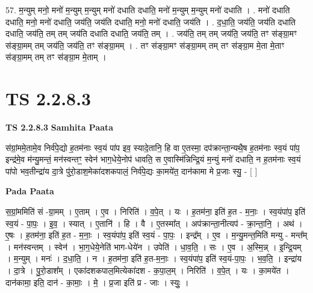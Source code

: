 \documentclass[17pt]{extarticle}
\begin{document}
57. म॒न्युम् मनो॒ मनो॑ म॒न्युम् म॒न्युम् मनो॑ दधाति दधाति॒ मनो॑ म॒न्युम् म॒न्युम् मनो॑ दधाति । . मनो॑ दधाति दधाति॒ मनो॒ मनो॑ दधाति॒ जय॑ति॒ जय॑ति दधाति॒ मनो॒ मनो॑ दधाति॒ जय॑ति । . द॒धा॒ति॒ जय॑ति॒ जय॑ति दधाति दधाति॒ जय॑ति॒ तम् तम् जय॑ति दधाति दधाति॒ जय॑ति॒ तम् । . जय॑ति॒ तम् तम् जय॑ति॒ जय॑ति॒ तꣳ स॑ङ्ग्रा॒मꣳ स॑ङ्ग्रा॒मम् तम् जय॑ति॒ जय॑ति॒ तꣳ स॑ङ्ग्रा॒मम् । . तꣳ स॑ङ्ग्रा॒मꣳ स॑ङ्ग्रा॒मम् तम् तꣳ स॑ङ्ग्रा॒म मे॒ता मे॒ताꣳ स॑ङ्ग्रा॒मम् तम् तꣳ स॑ङ्ग्रा॒म मे॒ताम् । \newline
\pagebreak
{}
\section*{ TS 2.2.8.3 }

\textbf{TS 2.2.8.3 } \newline
\textbf{Samhita Paata} \newline

स॑ग्रां॒ममे॒तामे॒व निर्व॑पे॒द्यो ह॒तम॑नाः स्व॒यं पा॑प इव॒ स्यादे॒तानि॒ हि वा ए॒तस्मा॒ दप॑क्रान्ता॒न्यथै॒ष ह॒तम॑नाः स्व॒यं पा॑प॒ इन्द्र॑मे॒व म॑न्यु॒मन्तं॒ मन॑स्वन्तꣳ॒॒ स्वेन॑ भाग॒धेये॒नोप॑ धावति॒ स ए॒वास्मि॑न्निन्द्रि॒यं म॒न्युं मनो॑ दधाति॒ न ह॒तम॑नाः स्व॒यं पा॑पो भव॒तीन्द्रा॑य दा॒त्रे पु॑रो॒डाश॒मेका॑दशकपालं॒ निर्व॑पे॒द्यः का॒मये॑त॒ दान॑कामा मे प्र॒जाः स्यु॒ - [  ] \newline

\textbf{Pada Paata} \newline

स॒ग्रां॒ममिति॑ सं -ग्रा॒मम् । ए॒ताम् । ए॒व । निरिति॑ । व॒पे॒त् । यः । ह॒तम॑ना॒ इति॑ ह॒त - म॒नाः॒ । स्व॒यंपा॑प॒ इति॑ स्व॒यं - पा॒पः॒ । इ॒व॒ । स्यात् । ए॒तानि॑ । हि । वै । ए॒तस्मा᳚त् । अप॑क्रान्ता॒नीत्यप॑ - क्रा॒न्ता॒नि॒ । अथ॑ । ए॒षः । ह॒तम॑ना॒ इति॑ ह॒त - म॒नाः॒ । स्व॒यंपा॑प॒ इति॑ स्व॒यं - पा॒पः॒ । इन्द्र᳚म् । ए॒व । म॒न्यु॒मन्त॒मिति॑ मन्यु - मन्त᳚म् । मन॑स्वन्तम् । स्वेन॑ । भा॒ग॒धेये॒नेति॑ भाग-धेये॑न । उपेति॑ । धा॒व॒ति॒ । सः । ए॒व । अ॒स्मि॒न्न् । इ॒न्द्रि॒यम् । म॒न्युम् । मनः॑ । द॒धा॒ति॒ । न । ह॒तम॑ना॒ इति॑ ह॒त-म॒नाः॒ । स्व॒यंपा॑प॒ इति॑ स्व॒यं-पा॒पः॒ । भ॒व॒ति॒ । इन्द्रा॑य । दा॒त्रे । पु॒रो॒डाश᳚म् । एका॑दशकपाल॒मित्येका॑दश - क॒पा॒ल॒म् । निरिति॑ । व॒पे॒त् । यः । का॒मये॑त । दान॑कामा॒ इति॒ दान॑ - का॒माः॒ । मे॒ । प्र॒जा इति॑ प्र - जाः । स्युः॒ ।  \newline
\end{document}

